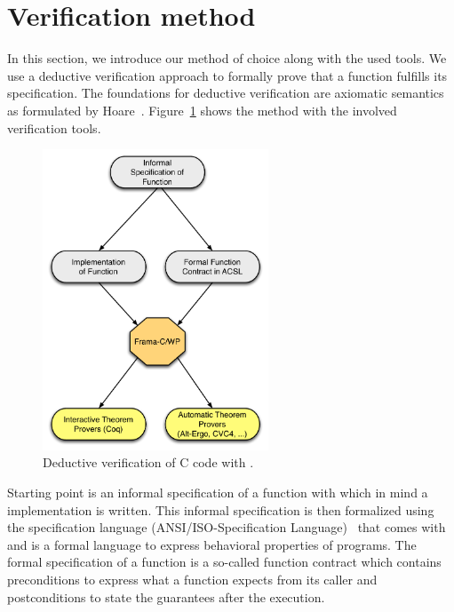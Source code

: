 \clearpage

\section{Verification method}
\label{sec:verification-method}
\label{method}

In this section, we introduce our method of choice along with the used tools.
We use a deductive verification approach to 
formally prove that a function fulfills its specification.
The foundations for deductive verification are axiomatic semantics as formulated
by Hoare~\cite{HoareCalculus}.
Figure~\ref{fig:method} shows the method with the involved verification tools.

\begin{figure}[hbt]
\centering
\includegraphics[width=0.60\textwidth]{figures/deductive-verification.pdf}
\caption{\label{fig:method} Deductive verification of C code with \framacwp.}
\end{figure}

Starting point is an informal specification of a function with which in mind
a implementation is written.
This informal specification is then formalized using the specification language
\acsl (ANSI\slash ISO-\isoc Specification Language)~\cite{acsl}
that comes with \framac and
is a formal language to express behavioral properties of \isoc programs.
The formal specification of a function is a so-called function contract
which contains preconditions to express what a function expects from its caller
and postconditions to state the guarantees after the execution.

